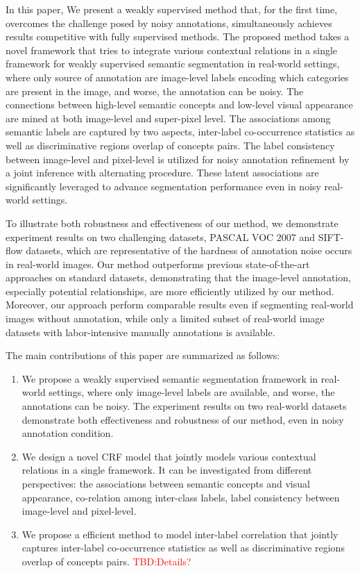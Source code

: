 In this paper, We present a weakly supervised method that, for the first time, overcomes the challenge posed by noisy annotations, simultaneously achieves results competitive with fully supervised methods. The proposed method takes a novel framework that tries to integrate various contextual relations in a single framework for weakly supervised semantic segmentation in real-world settings, where only source of annotation are image-level labels encoding which categories are present in the image, and worse, the annotation can be noisy. The connections between high-level semantic concepts and low-level visual appearance are mined at both image-level and super-pixel level. The associations among semantic labels are captured by two aspects, inter-label co-occurrence statistics as well as discriminative regions overlap of concepts pairs. The label consistency between image-level and pixel-level is utilized for noisy annotation refinement by a joint inference with alternating procedure. These latent associations are significantly leveraged to advance segmentation performance even in noisy real-world settings.

To illustrate both robustness and effectiveness of our method, we demonstrate experiment results on two challenging datasets, PASCAL VOC 2007 and SIFT-flow datasets,  which are representative of the hardness of annotation noise occurs in real-world images. Our method outperforms previous state-of-the-art approaches on standard datasets, demonstrating that the image-level annotation, especially potential relationships, are more efficiently utilized by our method. Moreover, our approach perform comparable results even if segmenting real-world images without annotation, while only a limited subset of real-world image datasets with labor-intensive manually annotations is available.

The main contributions of this paper are summarized as follows:
\begin{enumerate}
  \item We propose a weakly supervised semantic segmentation framework in real-world settings, where only image-level labels are available, and worse, the annotations can be noisy. The experiment results on two real-world datasets demonstrate both effectiveness and robustness of our method, even in noisy annotation condition.
  \item We design a novel CRF model that jointly models various contextual relations in a single framework. It can be investigated from different perspectives: the associations between semantic concepts and visual appearance, co-relation among inter-class labels, label consistency between image-level and pixel-level.
  \item We propose a efficient method to model inter-label correlation that jointly captures inter-label co-occurrence statistics as well as discriminative regions overlap of concepts pairs. {\textcolor{red}{TBD:Details?}}
\end{enumerate}

